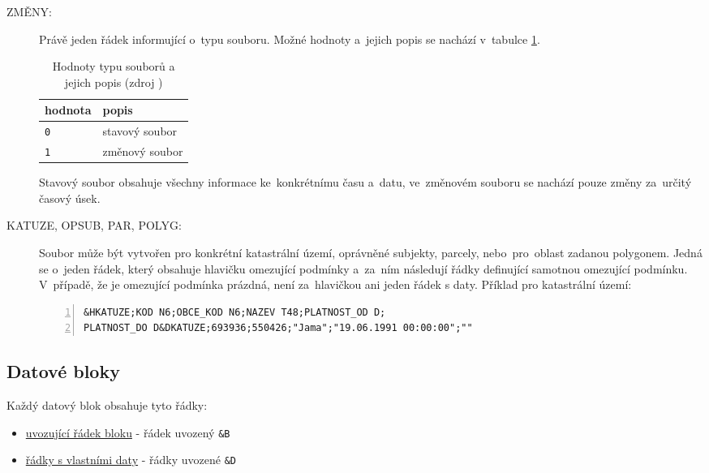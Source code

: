 \begin{description}
	\item[ZMĚNY:] Právě jeden řádek informující o~typu souboru. Možné hodnoty a~jejich popis se nachází v~tabulce \ref{tab:zmeny}.

		\begin{table}[H]
		\begin{tabular}{|l|l|}
		\hline
		 hodnota & popis \\
		\hline
		\hline
		 \texttt{0} & stavový soubor \\ \hline
		 \texttt{1} & změnový soubor \\
		 \hline
		\end{tabular}
		 \centering
		  \caption[Hodnoty typu souborů a~jejich popis]{Hodnoty typu souborů a jejich popis (zdroj \citep{struktura_vfk})}
		  \label{tab:zmeny}
		\end{table}

Stavový soubor obsahuje všechny informace ke~konkrétnímu času a~datu, ve~změnovém souboru se nachází pouze změny za~určitý časový úsek.

	\item[KATUZE, OPSUB, PAR, POLYG:] Soubor  může být vytvořen pro konkrétní katastrální území, oprávněné subjekty, parcely, nebo~pro~oblast zadanou polygonem. Jedná se o~jeden řádek, který obsahuje hlavičku omezující podmínky a~za~ním následují řádky definující samotnou omezující podmínku. V~případě, že je omezující podmínka prázdná, není za~hlavičkou ani jeden řádek s daty. Příklad pro katastrální území:

\begin{lstlisting}[basicstyle=\footnotesize\ttfamily, backgroundcolor = \color{light-gray},  numbers=left]
&HKATUZE;KOD N6;OBCE_KOD N6;NAZEV T48;PLATNOST_OD D;
PLATNOST_DO D&DKATUZE;693936;550426;"Jama";"19.06.1991 00:00:00";""
 \end{lstlisting}

\end{description}

\subsection{Datové bloky}
\label{datove_bloky}

Každý datový blok obsahuje tyto řádky:

	\begin{itemize}[leftmargin=1.5cm]
		\item \underline{uvozující řádek bloku} - řádek uvozený \texttt{\&B}
		\item \underline{řádky s vlastními daty} - řádky uvozené \texttt{\&D}
	\end{itemize}

